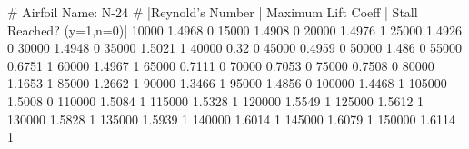 # Airfoil Name: N-24
# |Reynold's Number | Maximum Lift Coeff | Stall Reached? (y=1,n=0)|
10000 1.4968 0
15000 1.4908 0
20000 1.4976 1
25000 1.4926 0
30000 1.4948 0
35000 1.5021 1
40000 0.32 0
45000 0.4959 0
50000 1.486 0
55000 0.6751 1
60000 1.4967 1
65000 0.7111 0
70000 0.7053 0
75000 0.7508 0
80000 1.1653 1
85000 1.2662 1
90000 1.3466 1
95000 1.4856 0
100000 1.4468 1
105000 1.5008 0
110000 1.5084 1
115000 1.5328 1
120000 1.5549 1
125000 1.5612 1
130000 1.5828 1
135000 1.5939 1
140000 1.6014 1
145000 1.6079 1
150000 1.6114 1
